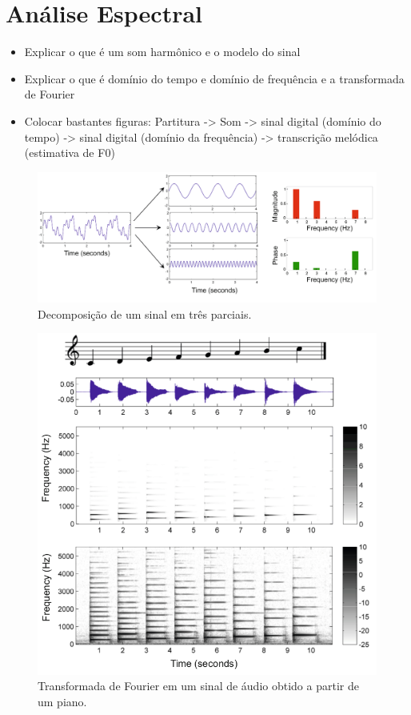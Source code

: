 \section{Análise Espectral}
\label{sec:fourier}

\begin{itemize}
\item Explicar o que é um som harmônico e o modelo do sinal
\item Explicar o que é domínio do tempo e domínio de frequência e a transformada de Fourier
\item Colocar bastantes figuras: Partitura -> Som -> sinal digital (domínio do tempo) -> sinal digital (domínio da frequência) -> transcrição melódica (estimativa de F0)
\end{itemize}

\begin{figure}[h]
\centering
\includegraphics[width=0.6\linewidth]{figuras/fourier3}
\caption{\label{fig:fourier}Decomposição de um sinal em três parciais.}
\end{figure}

\begin{figure}[h]
\centering
\includegraphics[width=0.6\linewidth]{figuras/fourier}
\caption{\label{fig:fourier}Transformada de Fourier em um sinal de áudio obtido a partir de um piano.}
\end{figure}